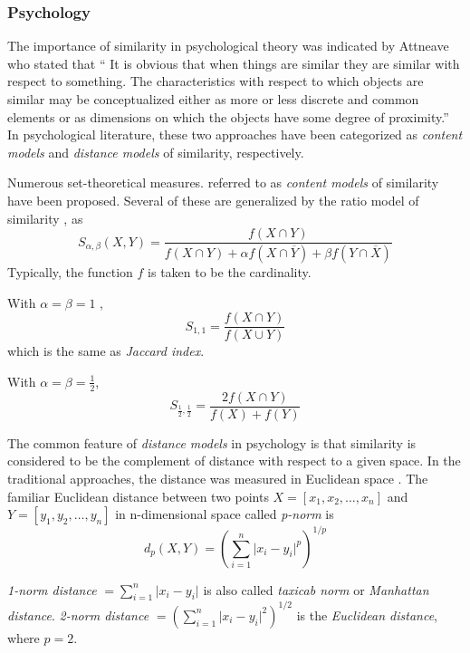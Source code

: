 \subsubsection{Psychology}
The importance of similarity in psychological theory was indicated by Attneave \cite{A50} who stated that `` It is obvious that when things are similar they are similar with respect to something. The characteristics with respect to which objects are similar may be conceptualized either as more or less discrete and common elements or as dimensions on which the objects have some degree of proximity.'' In psychological literature, these two approaches have been categorized as \textit{content models} and \textit{distance models} of similarity, respectively.

Numerous set-theoretical measures. referred to as \textit{content models} of similarity have been proposed. Several of these are generalized by the ratio model of similarity \cite{T77}, as
\begin{equation}\label{generalized similarity}
S_{\alpha,\beta}(X,Y)=\frac{f(X \cap Y)}{f(X \cap Y)+\alpha f(X \cap \overline{Y})+\beta f(Y \cap \overline{X})}
\end{equation}
Typically, the function $f$ is taken to be the cardinality. 

With $\alpha=\beta=1$ \cite{J08}, 
\begin{equation}
S_{1,1}=\frac{f(X \cap Y)}{f(X \cup Y)}
\end{equation}
which is the same as \textit{Jaccard index}. 

With $\alpha=\beta=\frac{1}{2}$,
\begin{equation}
S_{\frac{1}{2},\frac{1}{2}}=\frac{2f(X \cap Y)}{f(X) + f(Y)}
\end{equation}

The common feature of \textit{distance models} in psychology is that similarity is considered to be the complement of distance with respect to a given space. In the traditional approaches, the distance was measured in Euclidean space \cite{G46,R38,T65,YH59}. The familiar Euclidean distance between two points $X=[x_1, x_2, \dots, x_n]$ and $Y=[y_1, y_2, \dots, y_n]$ in n-dimensional space called \textit{p-norm} is
\begin{equation}\label{p-norm distance}
d_p (X,Y) = (\sum_{i=1}^{n}\lvert x_i - y_i \rvert ^p)^{1/p}
\end{equation}
 
\textit{1-norm distance} $= \sum_{i=1}^{n} \lvert x_i - y_i \rvert$ is also called \textit{taxicab norm} or \textit{Manhattan distance}. \textit{2-norm distance} $= (\sum_{i=1}^{n}\lvert x_i - y_i \rvert ^2)^{1/2}$ is the \textit{Euclidean distance}, where $p=2$.
